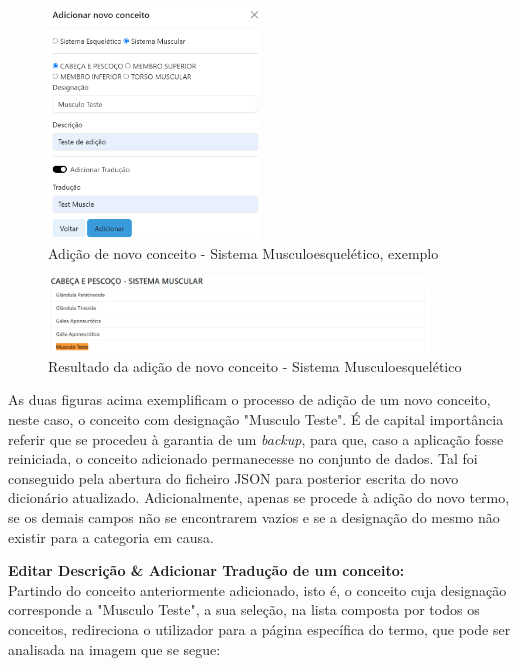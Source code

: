 \begin{figure}[H]
    \centering
    \centering
    \includegraphics[width=0.5\textwidth]{Images/add_ex.png}
    \caption{Adição de novo conceito - Sistema Musculoesquelético, exemplo}
    \label{fig:dic-traduc1}
\end{figure}

\begin{figure}[H]
    \centering
    \centering
    \includegraphics[width=0.9\textwidth]{Images/add_ex2.png}
    \caption{Resultado da adição de novo conceito - Sistema Musculoesquelético}
    \label{fig:dic-traduc1}
\end{figure}

As duas figuras acima exemplificam o processo de adição de um novo conceito, neste caso, o conceito com designação "Musculo Teste". É de capital importância referir que se procedeu à garantia de um \textit{backup}, para que, caso a aplicação fosse reiniciada, o conceito adicionado permanecesse no conjunto de dados. Tal foi conseguido pela abertura do ficheiro JSON para posterior escrita do novo dicionário atualizado. Adicionalmente, apenas se procede à adição do novo termo, se os demais campos não se encontrarem vazios e se a designação do mesmo não existir para a categoria em causa.

\textbf{Editar Descrição \& Adicionar Tradução de um conceito:}\\

Partindo do conceito anteriormente adicionado, isto é, o conceito cuja designação corresponde a "Musculo Teste", a sua seleção, na lista composta por todos os conceitos, redireciona o utilizador para a página específica do termo, que pode ser analisada na imagem que se segue:

